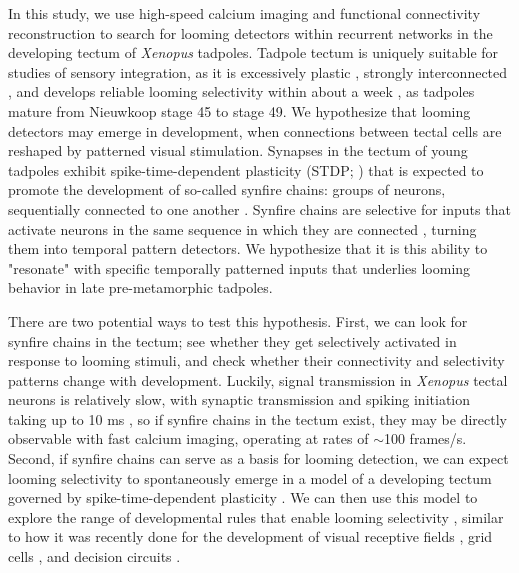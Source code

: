 \documentclass{article}
\begin{document}
In this study, we use high-speed calcium imaging and functional connectivity reconstruction to search for looming detectors within recurrent networks in the developing tectum of \textit{Xenopus} tadpoles. Tadpole tectum is uniquely suitable for studies of sensory integration, as it is excessively plastic \citep{pratt2007intrinsic, busch2019}, strongly interconnected \citep{james2015}, and develops reliable looming selectivity within about a week \citep{dong2009, khakhalin2014}, as tadpoles mature from Nieuwkoop stage 45 to stage 49. We hypothesize that looming detectors may emerge in development, when connections between tectal cells are reshaped by patterned visual stimulation. Synapses in the tectum of young tadpoles exhibit spike-time-dependent plasticity (STDP; \citealt{zhang1998stdp, mu2006stdp, vislay2006rf, richards2010stdp}) that is expected to promote the development of so-called synfire chains: groups of neurons, sequentially connected to one another \citep{fiete2010chains, zheng2014synfire}. Synfire chains are selective for inputs that activate neurons in the same sequence in which they are connected \citep{clopath2010stdpcoding}, turning them into temporal pattern detectors. We hypothesize that it is this ability to "resonate" with specific temporally patterned inputs that underlies looming behavior in late pre-metamorphic tadpoles. 

There are two potential ways to test this hypothesis. First, we can look for synfire chains in the tectum; see whether they get selectively activated in response to looming stimuli, and check whether their connectivity and selectivity patterns change with development. Luckily, signal transmission in \textit{Xenopus} tectal neurons is relatively slow, with synaptic transmission and spiking initiation taking up to 10 ms \citep{ciarleglio2015, jang2016, busch2019}, so if synfire chains in the tectum exist, they may be directly observable with fast calcium imaging, operating at rates of $\sim$100 frames/s. Second, if synfire chains can serve as a basis for looming detection, we can expect looming selectivity to spontaneously emerge in a model of a developing tectum governed by spike-time-dependent plasticity \citep{gao2015simplicity, pietri2017emergence}. We can then use this model to explore the range of developmental rules that enable looming selectivity \citep{linderman2017constrain, bassett2018models}, similar to how it was recently done for the development of visual receptive fields \citep{bashivan2018neural}, grid cells \citep{banino2018grid}, and decision circuits \citep{haesemeyer2018convergent}. 
\end{document}
